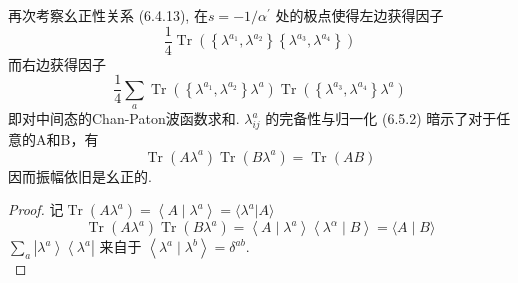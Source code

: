 再次考察幺正性关系 (6.4.13), 在$s=-1 / \alpha^{\prime}$ 处的极点使得左边获得因子
\begin{equation}
	\frac{1}{4} \operatorname{Tr}\left(\left\{\lambda^{a_{1}}, \lambda^{a_{2}}\right\}\left\{\lambda^{a_{3}}, \lambda^{a_{4}}\right\}\right)
\end{equation}
而右边获得因子
\begin{equation}
	\frac{1}{4} \sum_{a} \operatorname{Tr}\left(\left\{\lambda^{a_{1}}, \lambda^{a_{2}}\right\} \lambda^{a}\right) \operatorname{Tr}\left(\left\{\lambda^{a_{3}}, \lambda^{a_{4}}\right\} \lambda^{a}\right)
\end{equation}
即对中间态的Chan-Paton波函数求和.  $\lambda_{i j}^{a}$ 的完备性与归一化 (6.5.2) 暗示了对于任意的A和B，有
\begin{equation}
	\operatorname{Tr}\left(A \lambda^{a}\right) \operatorname{Tr}\left(B \lambda^{a}\right)=\operatorname{Tr}(A B)
\end{equation}
因而振幅依旧是幺正的.\\
\begin{proof}
记$\operatorname{Tr}\left(A \lambda^{a}\right)=\left\langle A \mid \lambda^{a}\right\rangle=\langle\lambda^{a}|A\rangle$
$$
\operatorname{Tr}\left(A \lambda^{a}\right) \operatorname{Tr}\left(B \lambda^{a}\right)=\left\langle A \mid \lambda^{a}\right\rangle\left\langle\lambda^{\alpha} \mid B\right\rangle=\langle A \mid B\rangle
$$
$\sum_{a}\left|\lambda^{a}\right\rangle\left\langle\lambda^{a}\right|$  来自于 $\left\langle\lambda^{a} \mid \lambda^{b}\right\rangle= \delta^{a b}$.\\
\end{proof}


